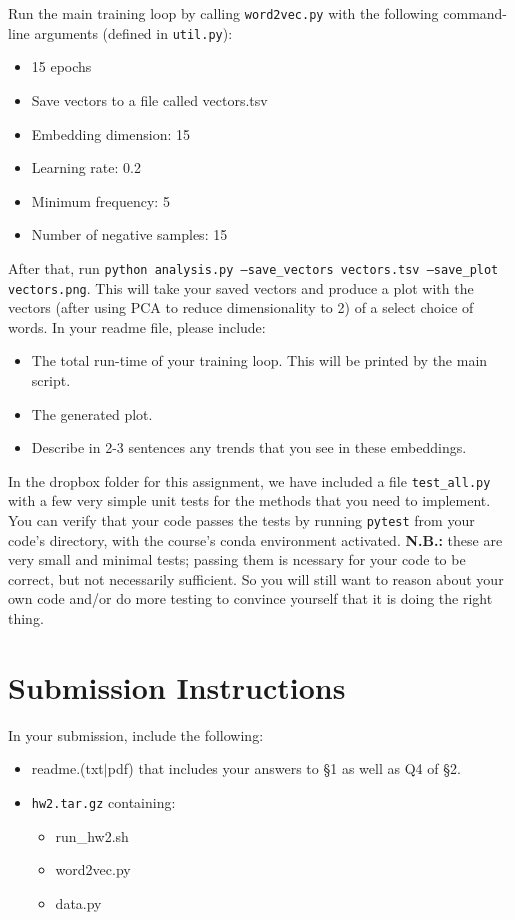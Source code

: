 \documentclass[11pt]{article}
\begin{document}
\vspace{2em}
 Run the main training loop by calling \texttt{word2vec.py} with the following command-line arguments (defined in \texttt{util.py}):
\begin{itemize}
  \item 15 epochs
  \item Save vectors to a file called vectors.tsv
  \item Embedding dimension: 15
  \item Learning rate: 0.2
  \item Minimum frequency: 5
  \item Number of negative samples: 15
\end{itemize}
After that, run \texttt{python analysis.py --save\_vectors vectors.tsv --save\_plot vectors.png}.  This will take your saved vectors and produce a plot with the vectors (after using PCA to reduce dimensionality to 2) of a select choice of words.  In your readme file, please include: 
\begin{itemize}
  \item The total run-time of your training loop.  This will be printed by the main script.
  \item The generated plot.
  \item Describe in 2-3 sentences any trends that you see in these embeddings.
\end{itemize}


\vspace{2em}
 In the dropbox folder for this assignment, we have included a file \texttt{test\_all.py} with a few very simple unit tests for the methods that you need to implement.  You can verify that your code passes the tests by running \texttt{pytest} from your code's directory, with the course's conda environment activated. {\bf N.B.:} these are very small and minimal tests; passing them is ncessary for your code to be correct, but not necessarily sufficient.  So you will still want to reason about your own code and/or do more testing to convince yourself that it is doing the right thing.


\section*{Submission Instructions}

In your submission, include the following:
\begin{itemize}
  \item readme.(txt$\mid$pdf) that includes your answers to \S1 as well as Q4 of \S2. 
  \item \texttt{hw2.tar.gz} containing:
  \begin{itemize}
    \item run\_hw2.sh
    \item word2vec.py
    \item data.py
  \end{itemize}
\end{itemize}
\end{document}
